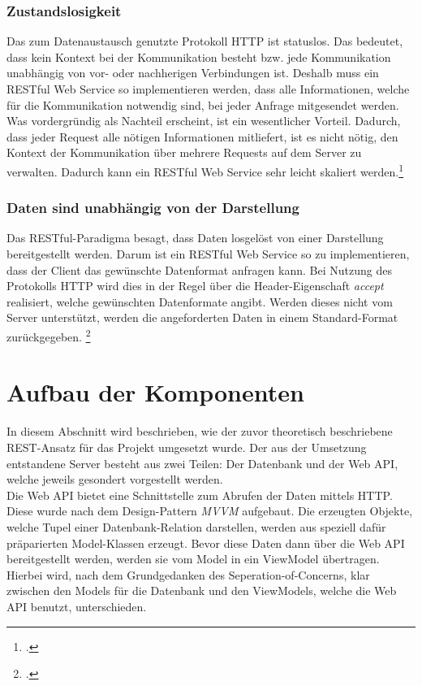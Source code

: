 \subsubsection*{Zustandslosigkeit}
Das zum Datenaustausch genutzte Protokoll \ac{HTTP} ist statuslos. Das bedeutet, dass kein Kontext bei der Kommunikation besteht bzw. jede Kommunikation unabhängig von vor- oder nachherigen Verbindungen ist. Deshalb muss ein \ac{REST}ful Web Service so implementieren werden, dass alle Informationen, welche für die Kommunikation notwendig sind, bei jeder Anfrage mitgesendet werden. Was vordergründig als Nachteil erscheint, ist ein wesentlicher Vorteil. Dadurch, dass jeder Request alle nötigen Informationen mitliefert, ist es nicht nötig, den Kontext der Kommunikation über mehrere Requests auf dem Server zu verwalten. Dadurch kann ein \ac{REST}ful Web Service sehr leicht skaliert werden.\footcite[S. 26ff.]{REST-und-HTTP}
\subsubsection*{Daten sind unabhängig von der Darstellung}
Das \ac{REST}ful-Paradigma besagt, dass Daten losgelöst von einer Darstellung bereitgestellt werden. Darum ist ein \ac{REST}ful Web Service so zu implementieren, dass der Client das gewünschte Datenformat anfragen kann. Bei Nutzung des Protokolls HTTP wird dies in der Regel über die Header-Eigenschaft \textit{accept} realisiert, welche gewünschten Datenformate angibt. Werden dieses nicht vom Server unterstützt, werden die angeforderten Daten in einem Standard-Format zurückgegeben. \footcite[S. 26ff.]{REST-und-HTTP}
\section{Aufbau der Komponenten}
\label{sec:aufbau-Komponenten}
In diesem Abschnitt wird beschrieben, wie der zuvor theoretisch beschriebene \ac{REST}-Ansatz für das Projekt umgesetzt wurde. Der aus der Umsetzung entstandene Server besteht aus zwei Teilen: Der Datenbank und der Web \ac{API}, welche jeweils gesondert vorgestellt werden. \\
Die Web \ac{API} bietet eine Schnittstelle zum Abrufen der Daten mittels \ac{HTTP}. Diese wurde nach dem Design-Pattern \textit{\ac{MVVM}} aufgebaut. Die erzeugten Objekte, welche Tupel einer Datenbank-Relation darstellen, werden aus speziell dafür präparierten Model-Klassen erzeugt. Bevor diese Daten dann über die Web \ac{API} bereitgestellt werden, werden sie vom Model in ein ViewModel übertragen. Hierbei wird, nach dem Grundgedanken des \gls{Seperation-of-Concerns}, klar zwischen den Models für die Datenbank und den ViewModels, welche die Web \ac{API} benutzt, unterschieden.
